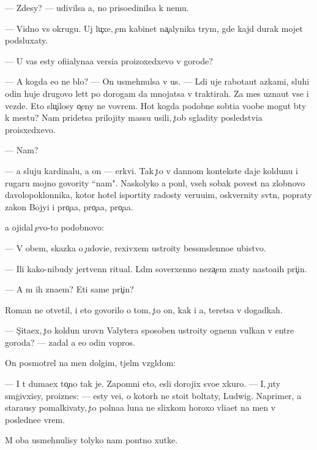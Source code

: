 \documentclass[10pt]{book}
\begin{document}
— Zdesy? — udivilsa {\y}a, no priso{\y}edinilsa k nemu.

— Vidno vs{\iu} okrugu. Uj lu{\c}xe, {\c}em kabinet na{\c}alynika t{\iu}rym{\yi}, gde kajd{\yi}{\y} durak mojet podsluxaty.

— U vas {\y}esty ofi{\q}ialyna{\y}a versi{\y}a pro{\y}izoxedxevo v gorode?

— A kogda {\y}e{\y}o ne b{\yi}lo? — On usmehnulsa v us{\yi}. — L{\iu}di uje rabota{\y}ut {\y}az{\yi}kami, sluhi odin huje drugovo let{\ia}t po dorogam da mnojatsa v traktirah. Za mes{\ia}{\q} uzna{\y}ut vse i vezde. Eto slu{\c}ilosy o{\c}eny ne vovrem{\ia}. Hot{\ia} kogda podobn{\yi}{\y}e sob{\yi}ti{\y}a voob{\x}e mogut b{\yi}ty k mestu? Nam pridetsa prilojity massu usili{\y}, {\c}tob{\yi} sgladity posledstvi{\y}a pro{\y}isxedxevo.

— Nam?

— {\Y}a sluju kardinalu, a on — {\Q}erkvi. Tak {\c}to v dannom kontekste daje koldunu i rugaru mojno govority ``nam". Naskolyko {\y}a pon{\ia}l, vseh sobak poves{\ia}t na zlobnovo d{\y}avolopoklonnika, kotor{\yi}{\y} hotel isportity radosty veru{\y}u{\x}im, oskvernity sv{\ia}t{\yi}n{\iu}, popraty zakon{\yi} Bojyi i pro{\c}a{\y}a, pro{\c}a{\y}a, pro{\c}a{\y}a.

{\Y}a ojidal {\c}evo-to podobnovo:

— V ob{\x}em, skazka o {\c}udovi{\x}e, rexivxem ustro{\y}ity bessm{\yi}slenno{\y}e ubi{\y}stvo.

— Ili kako{\y}-nibudy jertvenn{\yi}{\y} ritual. L{\iu}d{\ia}m soverxenno neza{\c}em znaty nasto{\y}a{\x}ih pri{\c}in.

— A m{\yi} ih zna{\y}em? Eti sam{\yi}{\y}e pri{\c}in{\yi}?

Roman ne otvetil, i eto govorilo o tom, {\c}to on, kak i {\y}a, ter{\ia}{\y}etsa v dogadkah.

— S{\c}ita{\y}ex, {\c}to koldun urovn{\ia} Valytera sposoben ustro{\y}ity ognenn{\yi}{\y} vulkan v {\q}entre goroda? — zadal {\y}a {\y}e{\x}o odin vopros.

On posmotrel na men{\ia} dolgim, t{\ia}jel{\yi}m vzgl{\ia}dom:

— I t{\yi} duma{\y}ex to{\c}no tak je. Zapomni eto, {\y}esli dorojix svo{\y}e{\y} xkuro{\y}. — I, {\c}uty sm{\ia}g{\c}ivxisy, pro{\y}iznes: — {\Y}esty ve{\x}i, o kotor{\yi}h ne sto{\y}it boltaty, Ludwig. Naprimer, {\y}a stara{\y}usy pomalkivaty, {\c}to polna{\y}a luna ne slixkom horoxo vli{\y}a{\y}et na men{\ia} v posledne{\y}e vrem{\ia}.

M{\yi} oba usmehnulisy tolyko nam pon{\ia}tno{\y} xutke.
\end{document}
